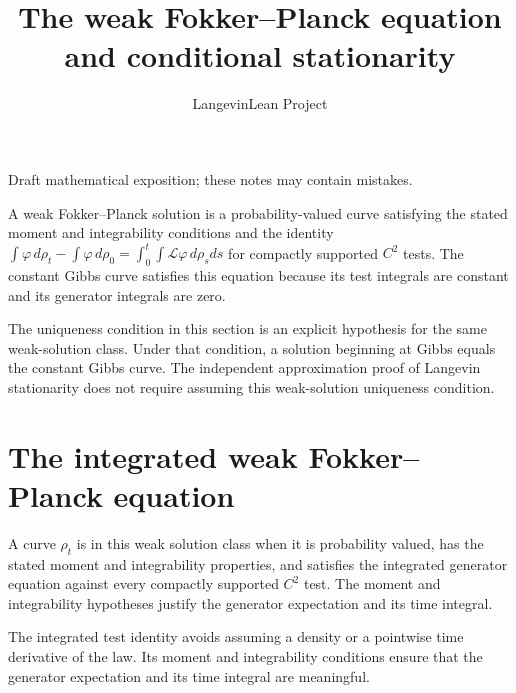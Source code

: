\documentclass[11pt,a4paper]{article}
\title{\texorpdfstring{The weak Fokker–Planck equation and conditional stationarity}{The weak Fokker–Planck equation and conditional stationarity}}
\author{LangevinLean Project}
\date{}
\begin{document}
\maketitle
Draft mathematical exposition; these notes may contain mistakes.


A weak Fokker–Planck solution is a probability-valued curve satisfying the stated moment and integrability conditions and the identity \(\int\varphi\,d\rho_t-\int\varphi\,d\rho_0=\int_0^t\int\mathcal L\varphi\,d\rho_sds\) for compactly supported \(C^2\) tests. The constant Gibbs curve satisfies this equation because its test integrals are constant and its generator integrals are zero.



The uniqueness condition in this section is an explicit hypothesis for the same weak-solution class. Under that condition, a solution beginning at Gibbs equals the constant Gibbs curve. The independent approximation proof of Langevin stationarity does not require assuming this weak-solution uniqueness condition.


\section{\texorpdfstring{The integrated weak Fokker–Planck equation}{The integrated weak Fokker–Planck equation}}


A curve \(\rho_t\) is in this weak solution class when it is probability valued, has the stated moment and integrability properties, and satisfies the integrated generator equation against every compactly supported \(C^2\) test. The moment and integrability hypotheses justify the generator expectation and its time integral.



The integrated test identity avoids assuming a density or a pointwise time derivative of the law. Its moment and integrability conditions ensure that the generator expectation and its time integral are meaningful.
\end{document}
